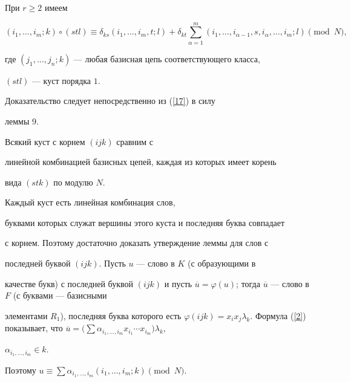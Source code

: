 \begin{lem} При $r\ge 2$ имеем


$$


(i_1,\dotsc ,i_m;k)\circ (stl)\equiv \delta _{ks}(i_1,\dotsc ,


i_m,t;l)+\delta _{kt}\sum_{\alpha =1}^m


(i_1,\dotsc ,i_{\alpha -1},s,i_{\alpha },\dotsc ,i_m;l)\pmod{N},


$$


где $(j_1,\dotsc ,j_n;k)$ --- любая базисная цепь соответствующего класса,


$(stl)$ --- куст порядка $1$.


\end{lem}





Доказательство следует непосредственно из (\ref{17}) в силу


леммы 9.





\begin{lem} Всякий куст с корнем $(ijk)$ сравним с


линейной комбинацией базисных цепей, каждая из которых имеет корень


вида $(stk)$ по модулю $N$.


\end{lem}





\begin{pf} Каждый куст есть линейная комбинация слов,


буквами которых служат вершины этого куста и последняя буква совпадает


с корнем. Поэтому достаточно доказать утверждение леммы для слов с


последней буквой $(ijk)$. Пусть $u$ --- слово в $K$ (с образующими в


качестве букв) с последней буквой $(ijk)$ и пусть $\overline{u}=


\varphi (u)$; тогда $\overline{u}$ --- слово в $F$ (с буквами --- базисными


элементами $R_1$), последняя буква которого есть $\varphi (ijk)=


x_ix_j\lambda _k$. Формула (\ref{2}) показывает, что $\overline{u}=


\bigl(\sum \alpha _{i_1,\dotsc ,i_m}x_{i_1}\dotsb x_{i_m}\bigr)\lambda _k$, 


$\alpha _{i_1,\dotsc ,i_m}\in k$.


Поэтому $u\equiv \sum \alpha _{i_1,\dotsc ,i_m}(i_1,\dotsc ,i_m;k)


\pmod{N}$.


\end{pf}





